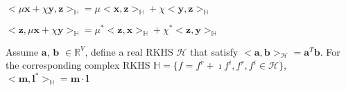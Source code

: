 \documentclass[12pt, draftclsnofoot, onecolumn]{IEEEtran}
\begin{document}
\begin{spacing}{2}
\begin{Property}
$<\mu\mathbf{x}+\chi\mathbf{y},\mathbf{z}>_{\mathbb{H}}=\mu<\mathbf{x},\mathbf{z}>_{\mathbb{H}}+\chi<\mathbf{y},\mathbf{z}>_{\mathbb{H}}$
\label{CHSProperty2}
\end{Property}

\begin{Property}
$<\mathbf{z}, \mu\mathbf{x}+\chi\mathbf{y}>_{\mathbb{H}}=\mu^{*}<\mathbf{z},\mathbf{x}>_{\mathbb{H}}+\chi^{*}<\mathbf{z}, \mathbf{y}>_{\mathbb{H}}$
\label{CHSProperty3}
\end{Property}

\begin{Lemma}
Assume $\mathbf{a}$, $\mathbf{b}$ $\in \mathbb{R}^{V}$, define a real RKHS $\mathcal{H}$ that satisfy $<\mathbf{a}, \mathbf{b}>_{\mathcal{H}}=\mathbf{a}^{T}\mathbf{b}$. For the corresponding complex RKHS $\mathbb{H}=\{f=f^{r}+\imath f^{i}, f^{r}, f^{i}\in \mathcal{H}\}$,
$<\mathbf{m},\mathbf{l}^{*}>_{\mathbb{H}}=\mathbf{m}\cdot \mathbf{l}$
\end{Lemma}    


\end{spacing}
\end{document}
